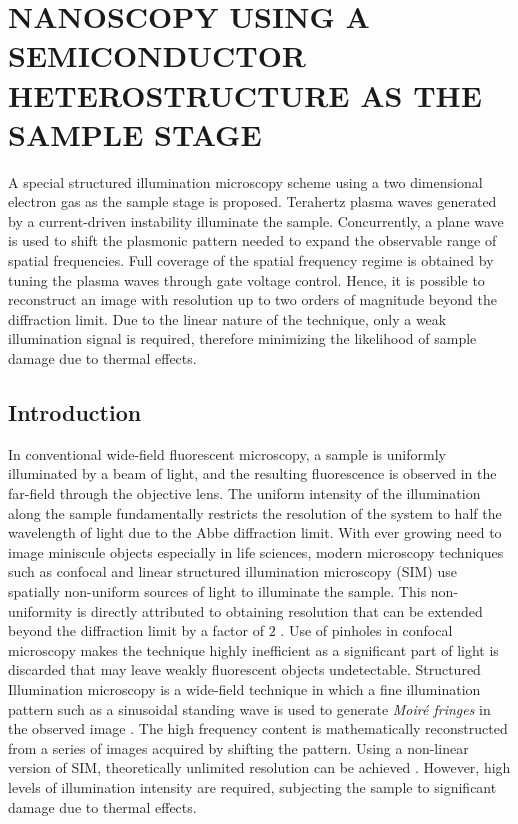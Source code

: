 \chapter{\uppercase{Nanoscopy using a semiconductor heterostructure as the sample stage}}



%
A special structured illumination microscopy scheme using a two dimensional electron gas as the sample stage is proposed. Terahertz plasma waves generated by a current-driven instability illuminate the sample. Concurrently, a plane wave is used to shift the plasmonic pattern needed to expand the observable range of spatial frequencies. Full coverage of the spatial frequency regime is obtained by tuning the plasma waves through gate voltage control. Hence, it is possible to reconstruct an image with resolution up to two orders of magnitude beyond the diffraction limit. Due to the linear nature of the technique, only a weak illumination signal is required, therefore minimizing the likelihood of sample damage due to thermal effects.
%
\section{Introduction}
%
In conventional wide-field fluorescent microscopy, a sample is uniformly illuminated by a beam of light, and the resulting fluorescence is observed in the far-field through the objective lens. The uniform intensity of the illumination along the sample fundamentally restricts the resolution of the system to half the wavelength of light due to the Abbe diffraction limit. With ever growing need to image miniscule objects especially in life sciences, modern microscopy techniques such as confocal and linear structured illumination microscopy (SIM) use spatially non-uniform sources of light to illuminate the sample. This non-uniformity is directly attributed to obtaining resolution that can be extended beyond the diffraction limit by a factor of $2$ \cite{Minsky1988,Gustafsson2000}. Use of pinholes in confocal microscopy makes the technique highly inefficient as a significant part of light is discarded that may leave weakly fluorescent objects undetectable. Structured Illumination microscopy is a wide-field technique in which a fine illumination pattern such as a sinusoidal standing wave is used to generate \emph{Moiré fringes} in the
observed image \cite{Heintzmann1999, Heintzmann2006}. The high frequency content is mathematically reconstructed from a series of images acquired by shifting the pattern. Using a non-linear version of SIM, theoretically unlimited resolution can be achieved \cite{Gustafsson2005}. However, high levels of illumination intensity are required, subjecting the sample to significant damage due to thermal effects.

